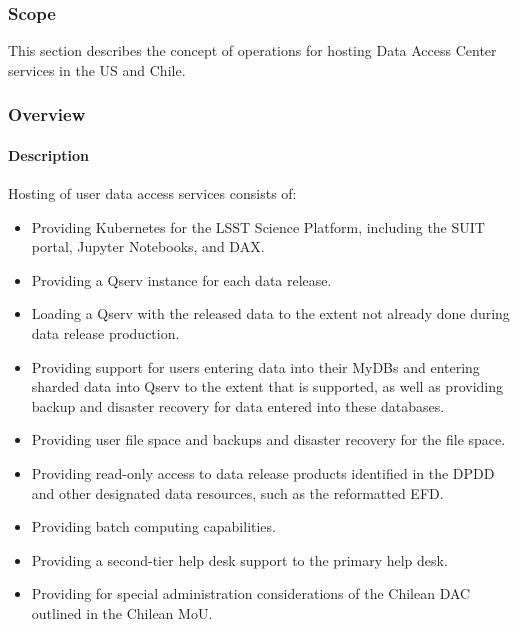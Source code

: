 ﻿\subsubsection{Scope}
This section describes the concept of operations for hosting Data Access Center services in the US and Chile.

\subsubsection{Overview}

\paragraph{Description}

Hosting of user data access services consists of:
\begin{itemize}

\item Providing Kubernetes for the LSST Science Platform, including the SUIT portal, Jupyter Notebooks, and DAX.

\item Providing a Qserv instance for each data release.

\item Loading a Qserv with the released data to the extent not already done during data release production.

\item Providing support for users entering data into their MyDBs and entering sharded data into Qserv to the extent that is supported, as well as providing backup and disaster recovery for data entered into these databases.

\item Providing user file space and backups and disaster recovery for the file space.

\item Providing read-only access to data release products identified in the DPDD and other designated data resources, such as the reformatted EFD.

\item Providing batch computing capabilities.

\item Providing a second-tier help desk support to the primary help desk.

\item Providing for special administration considerations of the Chilean DAC outlined in the Chilean MoU.


\end{itemize}
